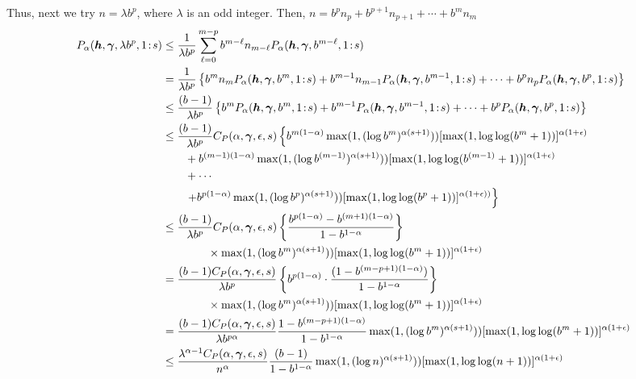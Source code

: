 \documentclass[authoryear]{elsarticle}
\newcommand{\onetos}{1\!:\!s}
\newcommand{\FredNote}[1]{{\color{blue}#1}}
\begin{document}
Thus, next we try $n = \lambda b^p$, where $\lambda$ is an odd integer. Then, $n = b^pn_p + b^{p+1}n_{p+1} + \cdots + b^m n_m$
\begin{align*}
    P_\alpha(\vh,\vgamma,\lambda b^p,\onetos)
    & \le \frac {1}{\lambda b^p} \sum_{\ell = 0}^{m-p} b^{m-\ell} n_{m -\ell} P_\alpha(\vh,\vgamma,b^{m-\ell},\onetos) \\
    &= \frac {1}{\lambda b^p} \left\{b^m n_m P_\alpha(\vh,\vgamma,b^m,\onetos) + b^{m-1} n_{m-1} P_\alpha(\vh,\vgamma,b^{m-1},\onetos) + \cdots + b^p n_p P_\alpha(\vh,\vgamma,b^p,\onetos) 
    \right\} \\ 
    & \le \frac {(b-1)}{\lambda b^p} \left\{b^m  P_\alpha(\vh,\vgamma,b^m,\onetos) + b^{m-1}  P_\alpha(\vh,\vgamma,b^{m-1},\onetos) + \cdots + b^p  P_\alpha(\vh,\vgamma,b^p,\onetos) 
    \right\} \\ 
    & \le \frac {(b-1)}{\lambda b^p} C_{P}(\alpha,\vgamma,\epsilon,s) \left\{ b^{m(1-\alpha)}\max(1, (\log b^{m})^{\alpha(s+1)})) [\max(1,\log \log (
    b^m+1))]^{\alpha(1+\epsilon)}\right .\\ 
    & \qquad  + b^{(m-1)(1-\alpha)}\max(1, (\log b^{(m-1)})^{\alpha(s+1)})) [\max(1,\log \log (
    b^{(m-1)}+1))]^{\alpha(1+\epsilon)}\\
      &  \qquad + \cdots \\
      & \qquad  \left . +   b^{p(1-\alpha)}\max(1,(\log b^{p})^{\alpha(s+1)})) [\max(1,\log \log (b^p+1))]^{\alpha(1+\epsilon))}  \right\}\\
    & \le \frac {(b-1)}{\lambda b^p} C_{P}(\alpha,\vgamma,\epsilon,s) 
    \left\{\frac{b^{p(1-\alpha)} - b^{(m+1)(1- \alpha )}}{1 - b^{1 -\alpha}}\right\} \\
     & \qquad \qquad \times \max(1, (\log b^{m})^{\alpha(s+1)})) [\max(1,\log \log (
    b^m+1))]^{\alpha(1+\epsilon)} \\
    & = \frac { (b-1) C_{P}(\alpha, \vgamma, \epsilon,s)}{\lambda b^p} \left\{ b^{p(1-\alpha)} \cdot \frac{(1 - b^{(m-p+1)(1- \alpha )})}{1 - b^{1- \alpha}}\right\} \\
    & \qquad \qquad \times \max(1, (\log b^{m})^{\alpha(s+1)})) [\max(1,\log \log (
    b^m+1))]^{\alpha(1+\epsilon)} \\
    &=  \frac {(b-1)C_{P}(\alpha, \vgamma, \epsilon,s)}{\lambda b^{p\alpha}}  \frac{1 - b^{(m-p+1)(1- \alpha )}}{1 - b^{1- \alpha}} \max(1, (\log b^{m})^{\alpha(s+1)})) [\max(1,\log \log (
    b^m+1))]^{\alpha(1+\epsilon)} \\
    &\le \frac{\lambda^{\alpha -1}{C}_{P}(\alpha, \vgamma,\epsilon,s)}{n^{\alpha}}  \frac {(b-1)} {1 - b^{1- \alpha}}   \max(1, (\log n )^{\alpha(s+1)})) [\max(1,\log \log (
    n+1))]^{\alpha(1+\epsilon)}
\end{align*}
\end{document}
